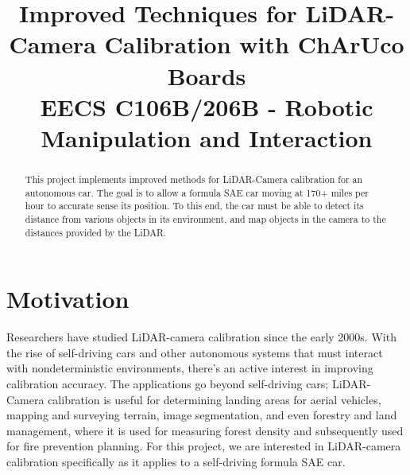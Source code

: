 \documentclass[conference]{IEEEtran}
\begin{document}
\graphicspath{ {./images/} }
\graphicspath{ {./images} }

\title{Improved Techniques for LiDAR-Camera Calibration with ChArUco Boards\\
{\footnotesize EECS C106B/206B - Robotic Manipulation and Interaction}
}

\author{
\and
{}
}


\maketitle

\begin{abstract}
This project implements improved methods for LiDAR-Camera calibration for an autonomous car. The goal is to allow a formula SAE car moving at 170+ miles per hour to accurate sense its position. To this end, the car must be able to detect its distance from various objects in its environment, and map objects in the camera to the distances provided by the LiDAR.
\end{abstract}

\section{Motivation}
Researchers have studied LiDAR-camera calibration since the early 2000s. With the rise of self-driving cars and other autonomous systems that must interact with nondeterministic environments, there's an active interest in improving calibration accuracy. The applications go beyond self-driving cars; LiDAR-Camera calibration is useful for determining landing areas for aerial vehicles, mapping and surveying terrain, image segmentation, and even forestry and land management, where it is used for measuring forest density and subsequently used for fire prevention planning. For this project, we are interested in LiDAR-camera calibration specifically as it applies to a self-driving formula SAE car.
\end{document}
